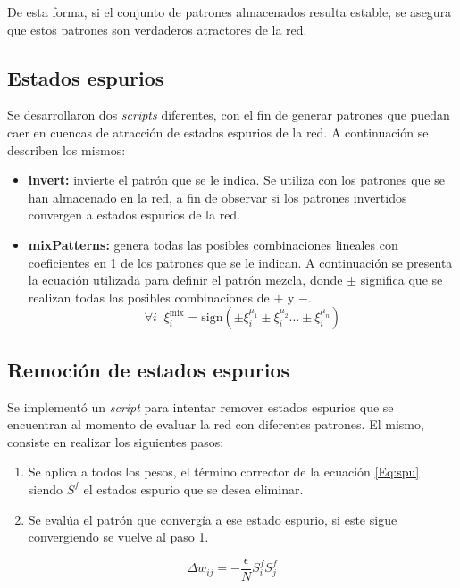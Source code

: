 \documentclass{article}
\begin{document}
De esta forma, si el conjunto de patrones almacenados resulta estable, se asegura que estos patrones son verdaderos
atractores de la red.


\subsection{Estados espurios}

Se desarrollaron dos \emph{scripts} diferentes, con el fin de generar patrones que puedan caer en cuencas de atracción de estados
espurios de la red. A continuación se describen los mismos:

\begin{itemize}
 \item \textbf{invert:} invierte el patrón que se le indica. Se utiliza con los patrones que se han almacenado en la red, a fin de
 observar si los patrones invertidos convergen a estados espurios de la red.
 \item \textbf{mixPatterns:} genera todas las posibles combinaciones lineales con coeficientes en 1 de los patrones que se le indican.
 A continuación se presenta la ecuación utilizada para definir el patrón mezcla, donde $\pm$ significa que se realizan 
 todas las posibles combinaciones de $+$ y $-$.
  \begin{equation}
    \forall i \;\; \xi^{\mbox{mix}}_{i} = \mbox{sign}(\pm \xi^{\mu_1}_i \pm \xi^{\mu_2}_i \dots \pm \xi^{\mu_n}_i)
  \end{equation}
\end{itemize}

\subsection{Remoción de estados espurios}

Se implementó un \emph{script} para intentar remover estados espurios que se encuentran al momento de evaluar
la red con diferentes patrones. El mismo, consiste en realizar los siguientes pasos:

\begin{enumerate}
 \item Se aplica a todos los pesos, el término corrector de la ecuación \ref{Eq:spu} siendo $S^f$ el estados espurio que se desea eliminar.
 \item Se evalúa el patrón que convergía a ese estado espurio, si este sigue convergiendo se vuelve al paso 1.
\end{enumerate}


\begin{equation}
  \label{Eq:spu}
   \Delta w_{ij} = -\dfrac{\epsilon}{N} S^{f}_{i} S^{f}_{j}
\end{equation}
\end{document}
